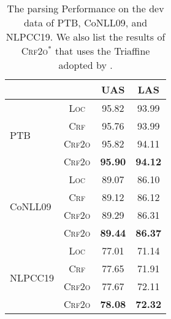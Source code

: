 \begin{table}[htb]
\centering
\begin{tabular}{lccc}
\hline
& & UAS & LAS \\
\hline
\multirow{4}{*}{PTB}
&\textsc{Loc}                & 95.82 & 93.99 \\
&\textsc{Crf}                  & 95.76 & 93.99 \\
&\textsc{Crf2o}\rlap{$^\ast$} & 95.82 & 94.11 \\
&\textsc{Crf2o}               & \textbf{95.90} & \textbf{94.12} \\
\hline
\multirow{4}{*}{CoNLL09}
&\textsc{Loc}                & 89.07 & 86.10 \\
&\textsc{Crf}                  & 89.12 & 86.12  \\
&\textsc{Crf2o}\rlap{$^\ast$} & 89.29 & 86.31  \\
&\textsc{Crf2o}               & \textbf{89.44} & \textbf{86.37} \\
\hline
\multirow{4}{*}{NLPCC19}
&\textsc{Loc}                & 77.01 & 71.14 \\
&\textsc{Crf}                  & 77.65 & 71.91 \\
&\textsc{Crf2o}\rlap{$^\ast$} & 77.67 & 72.11 \\
&\textsc{Crf2o}               & \textbf{78.08} & \textbf{72.32} \\
\hline
\end{tabular}

\caption{The parsing Performance on the dev data of PTB, CoNLL09, and NLPCC19. We also list the results of \textsc{Crf2o}$^\ast$ that uses the Triaffine adopted by \citet{wang-etal-2019-second}.}

\label{table:dev}
\end{table}

